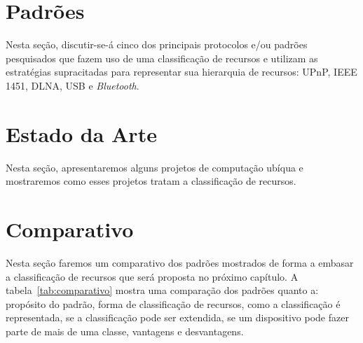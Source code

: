 \section{Padrões}

Nesta seção, discutir-se-á cinco dos principais protocolos e/ou padrões pesquisados que fazem uso de uma classificação de recursos e utilizam as estratégias supracitadas para representar sua hierarquia de recursos: UPnP, IEEE 1451, DLNA, USB e \emph{Bluetooth}.








\section{Estado da Arte}
Nesta seção, apresentaremos alguns projetos de computação ubíqua e mostraremos como esses projetos tratam a classificação de recursos.





\section{Comparativo}
Nesta seção faremos um comparativo dos padrões mostrados de forma a embasar a classificação de recursos que será proposta no próximo capítulo. A tabela~\ref{tab:comparativo} mostra uma comparação dos padrões quanto a: propósito do padrão, forma de classificação de recursos, como a classificação é representada, se a classificação pode ser extendida, se um dispositivo pode fazer parte de mais de uma classe, vantagens e desvantagens.

